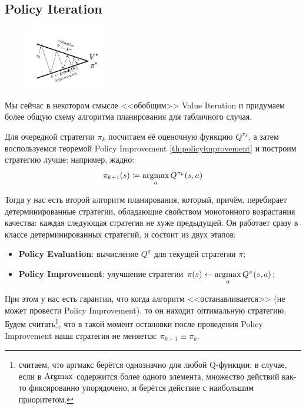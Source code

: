 
\subsection{Policy Iteration}

\begin{figure}
\vspace{-1cm}
\centering
\includegraphics[width=0.3\textwidth]{Images/PI_basic.png}
\vspace{-1cm}
\end{figure}

Мы сейчас в некотором смысле <<обобщим>> Value Iteration и придумаем более общую схему алгоритма планирования для табличного случая.

Для очередной стратегии $\pi_k$ посчитаем её оценочную функцию $Q^{\pi_k}$, а затем воспользуемся теоремой Policy Improvement \ref{th:policyimprovement} и построим стратегию лучше; например, жадно:
$$\pi_{k+1}(s) \coloneqq \mathop{\mathrm{argmax}}\limits_{a} Q^{\pi_k}(s, a)$$

Тогда у нас есть второй алгоритм планирования, который, причём, перебирает детерминированные стратегии, обладающие свойством монотонного возрастания качества: каждая следующая стратегия не хуже предыдущей. Он работает сразу в классе детерминированных стратегий, и состоит из двух этапов:
\begin{itemize}
    \item \textbf{Policy Evaluation}: вычисление $Q^\pi$ для текущей стратегии $\pi$;
    \item \textbf{Policy Improvement}: улучшение стратегии $\pi(s) \leftarrow \mathop{\mathrm{argmax}}\limits_a Q^\pi(s, a)$;
\end{itemize}

При этом у нас есть гарантии, что когда алгоритм <<останавливается>> (не может провести Policy Improvement), то он находит оптимальную стратегию. Будем считать\footnote{считаем, что аргмакс берётся однозначно для любой Q-функции: в случае, если в $\mathop{\mathrm{Argmax}}$ содержится более одного элемента, множество действий как-то фиксированно упорядочено, и берётся действие с наибольшим приоритетом.}, что в такой момент остановки после проведения Policy Improvement наша стратегия не меняется: $\pi_{k+1} \equiv \pi_k$.

